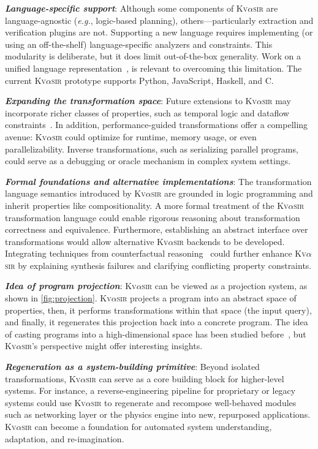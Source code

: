 \documentclass[nonacm,sigplan]{acmart}
\def\eg{{\em e.g.}, }
\newcommand{\sys}{{\scshape Kv{$\alpha$}sir}\xspace}
\newcommand{\heading}[1]{\vspace{2pt}\noindent\textbf{\emph{#1}}:\enspace}
\begin{document}
\heading{Language-specific support}
Although some components of \sys are language-agnostic (\eg logic-based planning),
others---particularly extraction and verification plugins are not.
Supporting a new language
requires implementing (or using an off-the-shelf) language-specific analyzers and constraints.
This modularity is deliberate,
but it does limit out-of-the-box generality.
Work on a unified language representation~\cite{koppel2018onetool,bap2011,dillig2009sail},
is relevant to overcoming this limitation.
The current \sys prototype
supports Python, JavaScript, Haskell, and C. 

\heading{Expanding the transformation space}
Future extensions to \sys may incorporate richer classes of properties, such as
temporal logic and dataflow
constraints~\cite{azzopardi2023ltl,handa2021orderawaredataflowmodelparallel}.
In addition, performance-guided transformations offer a compelling avenue: \sys
could optimize for runtime, memory usage, or even parallelizability.
Inverse
transformations, such as serializing parallel programs, could serve as
a debugging or oracle mechanism in complex system settings.

\heading{Formal foundations and alternative implementations}
The transformation language semantics introduced by \sys are grounded in logic
programming and inherit properties like compositionality.
A more formal treatment of the \sys
transformation language could enable rigorous reasoning about transformation
correctness and equivalence.
Furthermore, establishing an abstract interface
over transformations would allow alternative \sys backends to be developed.
Integrating techniques from
counterfactual reasoning~\cite{Cabalar_2020} could further enhance \sys by
explaining synthesis failures and clarifying conflicting property constraints.

\heading{Idea of program projection}
\sys can be viewed as a projection system, as shown in \cref{fig:projection}.
\sys projects a program into an abstract space of properties, 
then, it performs transformations within that space (the input query),
and finally, it regenerates this projection back into a concrete program.
The idea of casting programs into a high-dimensional space has been studied before~\cite{ben-nun2018neural,alon2019code2vec,ellis2020dreamcoder,nye2021platypus},
but \sys's perspective might offer interesting insights.

\heading{Regeneration as a system-building primitive}
Beyond isolated transformations, \sys can serve as a core building block for
higher-level systems.
For instance, a reverse-engineering pipeline for
proprietary or legacy systems could use \sys to regenerate and recompose
well-behaved modules such as networking layer or the physics engine into new,
repurposed applications.
\sys can become a foundation for automated system understanding, adaptation, and re-imagination.
\end{document}
